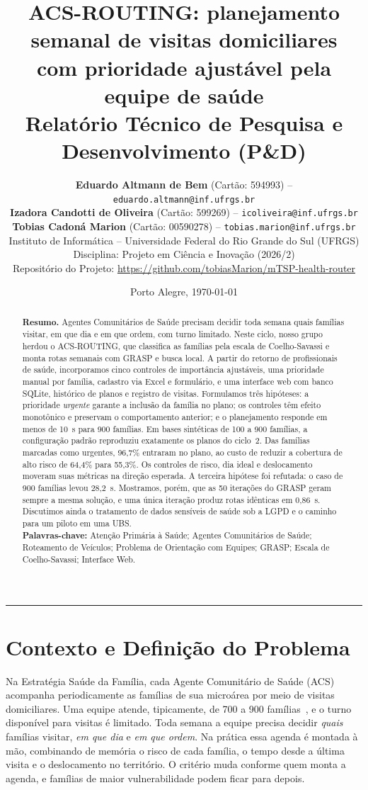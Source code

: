 \documentclass[11pt,a4paper]{article}
\title{
    \vspace{-1.0cm}
    \textbf{\Large ACS-ROUTING: planejamento semanal de visitas domiciliares\\ com prioridade ajustável pela equipe de saúde}\\[0.3cm]
    \large Relatório Técnico de Pesquisa e Desenvolvimento (P\&D)
}
\author{
    \textbf{Eduardo Altmann de Bem} (Cartão: 594993) -- \texttt{eduardo.altmann@inf.ufrgs.br}\\
    \textbf{Izadora Candotti de Oliveira} (Cartão: 599269) -- \texttt{icoliveira@inf.ufrgs.br}\\
    \textbf{Tobias Cadoná Marion} (Cartão: 00590278) -- \texttt{tobias.marion@inf.ufrgs.br}\\[0.3cm]
    \normalsize Instituto de Informática -- Universidade Federal do Rio Grande do Sul (UFRGS)\\
    \normalsize Disciplina: Projeto em Ciência e Inovação (2026/2)\\
    \small Repositório do Projeto: \url{https://github.com/tobiasMarion/mTSP-health-router}
}
\date{Porto Alegre, \today}
\begin{document}
\maketitle
\thispagestyle{fancy}

\begin{abstract}
\noindent
\textbf{Resumo.} Agentes Comunitários de Saúde precisam decidir toda semana quais famílias visitar, em que dia e em que ordem, com turno limitado. Neste ciclo, nosso grupo herdou o ACS-ROUTING, que classifica as famílias pela escala de Coelho-Savassi e monta rotas semanais com GRASP e busca local. A partir do retorno de profissionais de saúde, incorporamos cinco controles de importância ajustáveis, uma prioridade manual por família, cadastro via Excel e formulário, e uma interface web com banco SQLite, histórico de planos e registro de visitas. Formulamos três hipóteses: a prioridade \emph{urgente} garante a inclusão da família no plano; os controles têm efeito monotônico e preservam o comportamento anterior; e o planejamento responde em menos de 10~s para 900 famílias. Em bases sintéticas de 100 a 900 famílias, a configuração padrão reproduziu exatamente os planos do ciclo~2. Das famílias marcadas como urgentes, 96,7\% entraram no plano, ao custo de reduzir a cobertura de alto risco de 64,4\% para 55,3\%. Os controles de risco, dia ideal e deslocamento moveram suas métricas na direção esperada. A terceira hipótese foi refutada: o caso de 900 famílias levou 28,2~s. Mostramos, porém, que as 50 iterações do GRASP geram sempre a mesma solução, e uma única iteração produz rotas idênticas em 0,86~s. Discutimos ainda o tratamento de dados sensíveis de saúde sob a LGPD e o caminho para um piloto em uma UBS.
\\[0.3cm]
\textbf{Palavras-chave:} Atenção Primária à Saúde; Agentes Comunitários de Saúde; Roteamento de Veículos; Problema de Orientação com Equipes; GRASP; Escala de Coelho-Savassi; Interface Web.
\end{abstract}

\vspace{0.3cm}
\hrule
\vspace{0.4cm}

\section{Contexto e Definição do Problema}

Na Estratégia Saúde da Família, cada Agente Comunitário de Saúde (ACS) acompanha periodicamente as famílias de sua microárea por meio de visitas domiciliares. Uma equipe atende, tipicamente, de 700 a 900 famílias~\cite{coelho2004}, e o turno disponível para visitas é limitado. Toda semana a equipe precisa decidir \emph{quais} famílias visitar, \emph{em que dia} e \emph{em que ordem}. Na prática essa agenda é montada à mão, combinando de memória o risco de cada família, o tempo desde a última visita e o deslocamento no território. O critério muda conforme quem monta a agenda, e famílias de maior vulnerabilidade podem ficar para depois.
\end{document}
